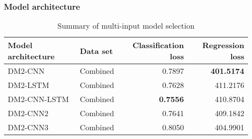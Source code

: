 \subsubsection{Model architecture}
\label{sub:comb_model_architecture}




\begin{table}
\begin{tabular}{llrr}
\toprule
Model architecture & Data set & Classification loss & Regression loss \\
\midrule
DM2-CNN & Combined & 0.7897 & \textbf{401.5174} \\
DM2-LSTM & Combined & 0.7628 & 411.2176 \\
DM2-CNN-LSTM & Combined & \textbf{0.7556} & 410.8704 \\
DM2-CNN2 & Combined & 0.7641 & 409.1842 \\
DM2-CNN3 & Combined & 0.8050 & 404.9901 \\
\bottomrule
\end{tabular}
\caption{Summary of multi-input model selection}
\label{tab:dm2_selection_results}
\end{table}

